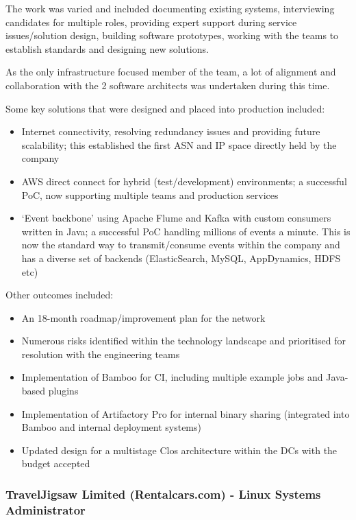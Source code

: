 The work was varied and included documenting existing systems,
interviewing candidates for multiple roles, providing expert support
during service issues/solution design, building software prototypes,
working with the teams to establish standards and designing new
solutions.

As the only infrastructure focused member of the team, a lot of
alignment and collaboration with the 2 software architects was
undertaken during this time.

Some key solutions that were designed and placed into production
included:

\begin{itemize}
\itemsep1pt\parskip0pt
\item
  Internet connectivity, resolving redundancy issues and providing
  future scalability; this established the first ASN and IP space
  directly held by the company
\item
  AWS direct connect for hybrid (test/development) environments; a
  successful PoC, now supporting multiple teams and production services
\item
  `Event backbone' using Apache Flume and Kafka with custom consumers
  written in Java; a successful PoC handling millions of events a
  minute. This is now the standard way to transmit/consume events within
  the company and has a diverse set of backends (ElasticSearch, MySQL,
  AppDynamics, HDFS etc)
\end{itemize}

Other outcomes included:

\begin{itemize}
\itemsep1pt\parskip0pt
\item
  An 18-month roadmap/improvement plan for the network
\item
  Numerous risks identified within the technology landscape and
  prioritised for resolution with the engineering teams
\item
  Implementation of Bamboo for CI, including multiple example jobs and
  Java-based plugins
\item
  Implementation of Artifactory Pro for internal binary sharing
  (integrated into Bamboo and internal deployment systems)
\item
  Updated design for a multistage Clos architecture within the DCs with
  the budget accepted
\end{itemize}

\subsubsection{TravelJigsaw Limited (Rentalcars.com) - Linux Systems
Administrator}\label{traveljigsaw-limited-rentalcars.com---linux-systems-administrator}

